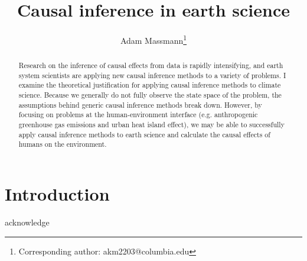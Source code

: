 \documentclass[12pt]{article}
\begin{document}
\title{Causal inference in earth science}

\author[1]{Adam Massmann\thanks{Corresponding author: akm2203@columbia.edu}}


\maketitle

\begin{abstract}
  Research on the inference of causal effects from data is rapidly
  intensifying, and earth system scientists are applying new causal
  inference methods to a variety of problems. I examine the
  theoretical justification for applying causal inference methods to
  climate science. Because we generally do not fully observe the state
  space of the problem, the assumptions behind generic causal
  inference methods break down. However, by focusing on problems at
  the human-environment interface (e.g. anthropogenic greenhouse gas
  emissions and urban heat island effect), we may be able to
  successfully apply causal inference methods to earth science and
  calculate the causal effects of humans on the environment.

\end{abstract}

\onehalfspacing

\section{Introduction}

\acknowledgments acknowledge
\end{document}
